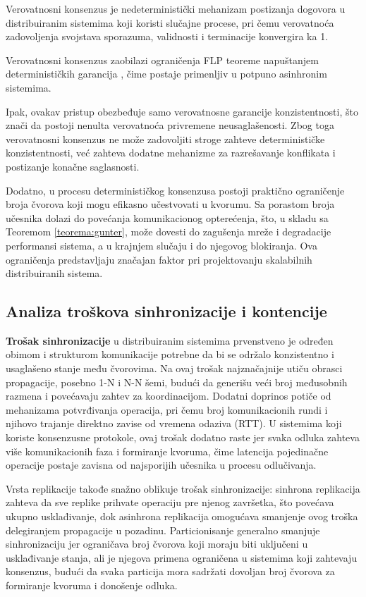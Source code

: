 \begin{definicija}
Verovatnosni konsenzus je nedeterministički mehanizam postizanja dogovora u distribuiranim sistemima koji koristi slučajne procese, pri čemu verovatnoća zadovoljenja svojstava sporazuma, validnosti i terminacije konvergira ka 1.
\end{definicija}

Verovatnosni konsenzus zaobilazi ograničenja FLP teoreme napuštanjem determinističkih garancija \cite{ben1983another}, čime postaje primenljiv u potpuno asinhronim sistemima.

Ipak, ovakav pristup obezbeđuje samo verovatnosne garancije konzistentnosti, što znači da postoji nenulta verovatnoća privremene neusaglašenosti. Zbog toga verovatnosni konsenzus ne može zadovoljiti stroge zahteve determinističke konzistentnosti, već zahteva dodatne mehanizme za razrešavanje konflikata i postizanje konačne saglasnosti.

Dodatno, u procesu determinističkog konsenzusa postoji praktično ograničenje broja čvorova koji mogu efikasno učestvovati u kvorumu. Sa porastom broja učesnika dolazi do povećanja komunikacionog opterećenja, što, u skladu sa Teoremom \ref{teorema:gunter}, može dovesti do zagušenja mreže i degradacije performansi sistema, a u krajnjem slučaju i do njegovog blokiranja. Ova ograničenja predstavljaju značajan faktor pri projektovanju skalabilnih distribuiranih sistema.

\subsection{Analiza troškova sinhronizacije i kontencije}
\textbf{Trošak sinhronizacije} u distribuiranim sistemima prvenstveno je određen obimom i strukturom komunikacije potrebne da bi se održalo konzistentno i usaglašeno stanje među čvorovima. Na ovaj trošak najznačajnije utiču obrasci propagacije, posebno 1-N i N-N šemi, budući da generišu veći broj međusobnih razmena i povećavaju zahtev za koordinacijom. Dodatni doprinos potiče od mehanizama potvrđivanja operacija, pri čemu broj komunikacionih rundi i njihovo trajanje direktno zavise od vremena odaziva (RTT). U sistemima koji koriste konsenzusne protokole, ovaj trošak dodatno raste jer svaka odluka zahteva više komunikacionih faza i formiranje kvoruma, čime latencija pojedinačne operacije postaje zavisna od najsporijih učesnika u procesu odlučivanja.

Vrsta replikacije takođe snažno oblikuje trošak sinhronizacije: sinhrona replikacija zahteva da sve replike prihvate operaciju pre njenog završetka, što povećava ukupno usklađivanje, dok asinhrona replikacija omogućava smanjenje ovog troška delegiranjem propagacije u pozadinu. Particionisanje generalno smanjuje sinhronizaciju jer ograničava broj čvorova koji moraju biti uključeni u usklađivanje stanja, ali je njegova primena ograničena u sistemima koji zahtevaju konsenzus, budući da svaka particija mora sadržati dovoljan broj čvorova za formiranje kvoruma i donošenje odluka.

